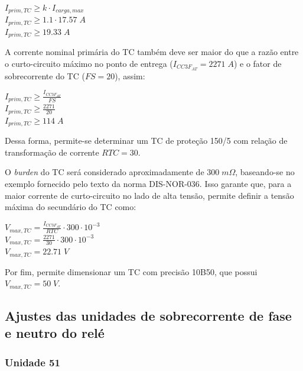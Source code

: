 \begin{center}
$I_{prim,TC} \ge  k \cdot I_{carga,max}$ \\
$I_{prim,TC} \ge 1.1 \cdot 17.57 \; A$ \\
$I_{prim,TC} \ge 19.33 \; A$ 
\end{center}

A corrente nominal primária do TC também deve ser maior do que a razão entre o curto-circuito máximo no ponto de entrega ($I_{CC3F_{AT}} = 2271 \; A$) e o fator de sobrecorrente do TC ($FS=20$), assim:

\begin{center}
$I_{prim,TC} \ge  \frac{I_{CC3F_{AT}} }{FS}$ \\ \vspace{5pt}
$I_{prim,TC} \ge \frac{2271}{20}$ \\ \vspace{5pt}
$I_{prim,TC} \ge 114 \; A$ 
\end{center}

Dessa forma, permite-se determinar um TC de proteção 150/5 com relação de transformação de corrente $RTC=30$. 

O \textit{burden} do TC será considerado aproximadamente de $300 \; m\Omega$, baseando-se no exemplo fornecido pelo texto da norma DIS-NOR-036. Isso garante que, para a maior corrente de curto-circuito no lado de alta tensão, permite definir a tensão máxima do secundário do TC como:

\begin{center}
$V_{max,TC} = \frac{I_{CC3F_{AT}}}{RTC} \cdot 300 \cdot 10^{-3}$ \\ \vspace{5pt}
$V_{max,TC} = \frac{2271}{30} \cdot 300 \cdot 10^{-3}$ \\ \vspace{5pt}
$V_{max,TC} = 22.71 \; V$ 
\end{center}

Por fim, permite dimensionar um TC com precisão 10B50, que possui $V_{max,TC} = 50 \; V$.


\subsection{Ajustes das unidades de sobrecorrente de fase e neutro do relé}

\subsubsection{Unidade 51}

